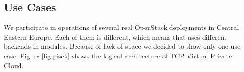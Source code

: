 
\subsection{Use Cases}

We participate in operations of several real OpenStack deployments in Central Eastern Europe. Each of them is different, which means that uses different backends in modules.
Because of lack of space we decided to show only one use case. Figure \ref{fig:pisek} shows the logical architecture of TCP Virtual Private Cloud.



